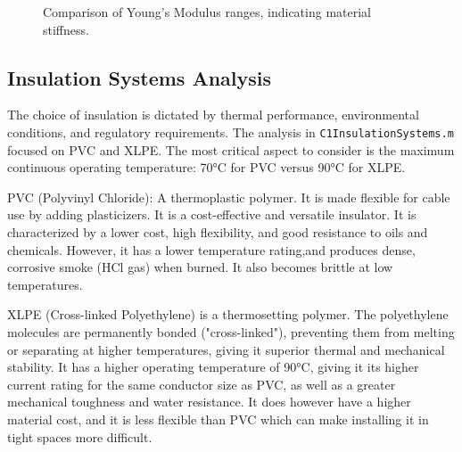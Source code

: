 \documentclass[12pt, a4paper]{article}
\begin{document}
\begin{figure}[h!]
    \centering
    \caption{Comparison of Young's Modulus ranges, indicating material stiffness.}
    \label{fig:youngs_modulus}
\end{figure}

\newpage

\subsection{Insulation Systems Analysis}
The choice of insulation is dictated by thermal performance, environmental conditions, and regulatory requirements. The analysis in \texttt{C1InsulationSystems.m} focused on PVC and XLPE. The most critical aspect to consider is the maximum continuous operating temperature: 70°C for PVC versus 90°C for XLPE.

PVC (Polyvinyl Chloride): A thermoplastic polymer. It is made flexible for cable use by adding plasticizers. It is a cost-effective and versatile insulator. It is characterized by a lower cost, high flexibility, and good resistance to oils and chemicals. However, it has a lower temperature rating,and produces dense, corrosive smoke (HCl gas) when burned. It also becomes brittle at low temperatures.

XLPE (Cross-linked Polyethylene) is a thermosetting polymer. The polyethylene molecules are permanently bonded ("cross-linked"), preventing them from melting or separating at higher temperatures, giving it superior thermal and mechanical stability. It has a higher operating temperature of 90°C, giving it its higher current rating for the same conductor size as PVC, as well as a greater mechanical toughness and water resistance. It does however have a  higher material cost, and it is less flexible than PVC which can make installing it in tight spaces more difficult.
\end{document}
